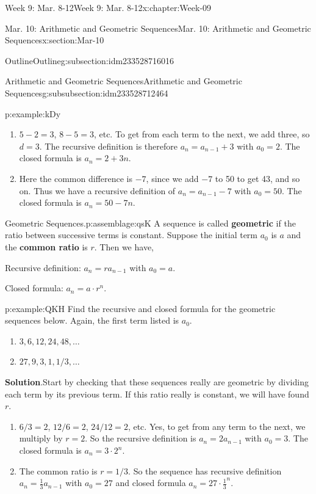 \documentclass[oneside,10pt,]{book}
\newcommand{\blocktitlefont}{\relax}
\newcommand{\terminology}[1]{\textbf{#1}}
\numberwithin{equation}{section}
\begin{document}
\begin{chapterptx}{Week 9: Mar. 8-12}{}{Week 9: Mar. 8-12}{}{}{x:chapter:Week-09}
\begin{sectionptx}{Mar. 10: Arithmetic and Geometric Sequences}{}{Mar. 10: Arithmetic and Geometric Sequences}{}{}{x:section:Mar-10}
\begin{subsectionptx}{Outline}{}{Outline}{}{}{g:subsection:idm233528716016}
\begin{subsubsectionptx}{Arithmetic and Geometric Sequences}{}{Arithmetic and Geometric Sequences}{}{}{g:subsubsection:idm233528712464}
\begin{example}{}{p:example:kDy}
\par
%
\begin{enumerate}
\item{}\(5-2 = 3\), \(8-5 = 3\), etc. To get from each term to the next, we add three, so \(d = 3\). The recursive definition is therefore \(a_n = a_{n-1} + 3\) with \(a_0 = 2\). The closed formula is \(a_n = 2 + 3n\).%
\item{}Here the common difference is \(-7\), since we add \(-7\) to 50 to get 43, and so on. Thus we have a recursive definition of \(a_n = a_{n-1} - 7\) with \(a_0 = 50\). The closed formula is \(a_n = 50 - 7n\).%
\end{enumerate}
%
\end{example}
\begin{assemblage}{Geometric Sequences.}{p:assemblage:qsK}%
A sequence is called \terminology{geometric} if the ratio between successive terms is constant. Suppose the initial term \(a_0\) is \(a\) and the \terminology{common ratio} is \(r\). Then we have,%
\par
Recursive definition: \(a_n = ra_{n-1}\) with \(a_0 = a\).%
\par
Closed formula: \(a_n = a\cdot r^{n}\).%
\end{assemblage}
\begin{example}{}{p:example:QKH}%
Find the recursive and closed formula for the geometric sequences below. Again, the first term listed is \(a_0\).%
\begin{enumerate}
\item{}\(\displaystyle 3, 6, 12, 24, 48, \ldots\)%
\item{}\(\displaystyle 27, 9, 3, 1, 1/3, \ldots\)%
\end{enumerate}
%
\par\smallskip%
\noindent\textbf{\blocktitlefont Solution}.\hypertarget{p:solution:NQb}{}\quad{}Start by checking that these sequences really are geometric by dividing each term by its previous term. If this ratio really is constant, we will have found \(r\).%
\begin{enumerate}
\item{}\(6/3 = 2\), \(12/6 = 2\), \(24/12 = 2\), etc. Yes, to get from any term to the next, we multiply by \(r = 2\). So the recursive definition is \(a_n = 2a_{n-1}\) with \(a_0 = 3\). The closed formula is \(a_n = 3\cdot 2^{n}\).%
\item{}The common ratio is \(r = 1/3\). So the sequence has recursive definition \(a_n = \frac{1}{3}a_{n-1}\) with \(a_0 = 27\) and closed formula \(a_n = 27\cdot \frac{1}{3}^{n}\).%

\end{enumerate}
\end{example}
\end{subsubsectionptx}
\end{subsectionptx}
\end{sectionptx}
\end{chapterptx}
\end{document}
